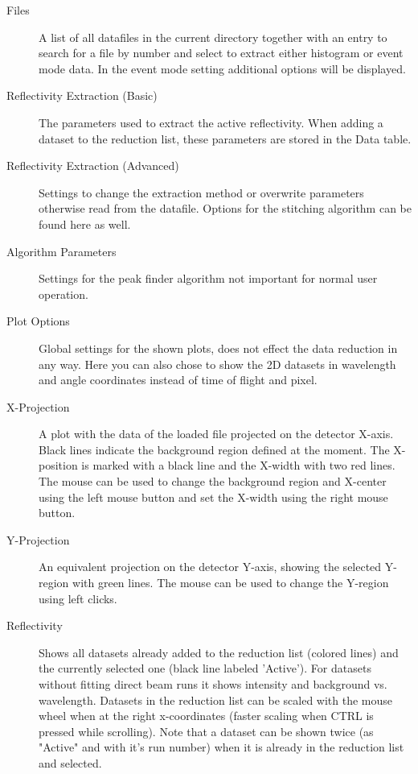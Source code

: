   \begin{description}
   \item[Files] A list of all datafiles in the current directory together with an entry to search for a file by number and select to extract either histogram or event mode data. In the event mode setting additional options will be displayed.

   \item[Reflectivity Extraction (Basic)] The parameters used to extract the active reflectivity. When adding a dataset to the reduction list, these parameters are stored in the Data table.
   \item[Reflectivity Extraction (Advanced)] Settings to change the extraction method or overwrite parameters otherwise read from the datafile. Options for the stitching algorithm can be found here as well.
   \item[Algorithm Parameters] Settings for the peak finder algorithm not important for normal user operation.
   \item[Plot Options] Global settings for the shown plots, does not effect the data reduction in any way. Here you can also chose to show the 2D datasets in wavelength and angle coordinates instead of time of flight and pixel.
   
   
   \item[X-Projection] A plot with the data of the loaded file projected on the detector X-axis. Black lines indicate the background region defined at the moment. The X-position is marked with a black line and the X-width with two red lines. The mouse can be used to change the background region and X-center using the left mouse button and set the X-width using the right mouse button.
   \item[Y-Projection] An equivalent projection on the detector Y-axis, showing the selected Y-region with green lines. The mouse can be used to change the Y-region using left clicks.
   
   \item[Reflectivity] Shows all datasets already added to the reduction list (colored lines) and the currently selected one (black line labeled 'Active'). For datasets without fitting direct beam runs it shows intensity and background vs. wavelength. 
   Datasets in the reduction list can be scaled with the mouse wheel when at the right x-coordinates (faster scaling when CTRL is pressed while scrolling).
   Note that a dataset can be shown twice (as "Active" and with it's run number) when it is already in the reduction list and selected.
\end{description}

